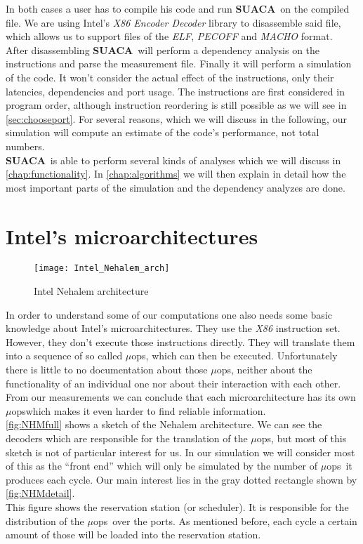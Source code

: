 \documentclass[a4paper,12pt,titlepage, twoside]{report}
\newcommand{\suaca}{\textbf{SUACA}}
\newcommand{\microops}{$\mu$ops}
\begin{document}
In both cases a user has to compile his code and run \suaca\ on the compiled file. We are using Intel's \emph{X86 Encoder Decoder
} library \cite{xed} to disassemble said file, which allows us to support files of the \emph{ELF}, \emph{PECOFF} and \emph{MACHO} format.\\
After disassembling \suaca\ will perform a dependency analysis on the instructions and parse the measurement file. Finally it will perform a simulation of the code. It won't consider the actual effect of the instructions, only their latencies, dependencies and port usage. The instructions are first considered in program order, although instruction reordering is still possible as we will see in \autoref{sec:chooseport}. For several reasons, which we will discuss in the following, our simulation will compute an estimate of the code's performance, not total numbers.\\
\suaca\ is able to perform several kinds of analyses which we will discuss in \autoref{chap:functionality}. In \autoref{chap:algorithms} we will then explain in detail how the most important parts of the simulation and the dependency analyzes are done.


\section{Intel's microarchitectures}


\begin{wrapfigure}[25]{l}{0.6\textwidth}
    \texttt{[image: Intel\_Nehalem\_arch]}
    \caption{Intel Nehalem architecture \cite{nehalem}}
    \label{fig:NHMfull}
\end{wrapfigure}


In order to understand some of our computations one also needs some basic knowledge about Intel's microarchitectures. They use the \emph{X86} instruction set. However, they don't execute those instructions directly. They will translate them into a sequence of so called \microops, which can then be executed. Unfortunately there is little to no documentation about those \microops, neither about the functionality of an individual one nor about their interaction with each other. From our measurements we can conclude that each microarchitecture has its own \microops which makes it even harder to find reliable information.\\ \autoref{fig:NHMfull} shows a sketch of the Nehalem architecture. We can see the decoders which are responsible for the translation of the \microops, but most of this sketch is not of particular interest for us. In our simulation we will consider most of this as the ``front end'' which will only be simulated by the number of \microops\ it produces each cycle. Our main interest lies in the gray dotted rectangle shown by \autoref{fig:NHMdetail}.\\
This figure shows the reservation station (or scheduler). It is responsible for the distribution of the \microops\ over the ports. As mentioned before, each cycle a certain amount of those will be loaded into the reservation station.
\end{document}
